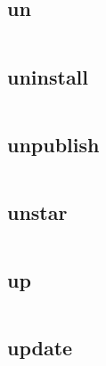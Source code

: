 \subsection{un}

\begin{lstlisting}[language=bash]

\end{lstlisting}

\subsection{uninstall}


\begin{lstlisting}[language=bash]

\end{lstlisting}

\subsection{unpublish}



\begin{lstlisting}[language=bash]

\end{lstlisting}

\subsection{unstar}




\begin{lstlisting}[language=bash]

\end{lstlisting}

\subsection{up}



\begin{lstlisting}[language=bash]

\end{lstlisting}

\subsection{update}



\begin{lstlisting}[language=bash]

\end{lstlisting}

